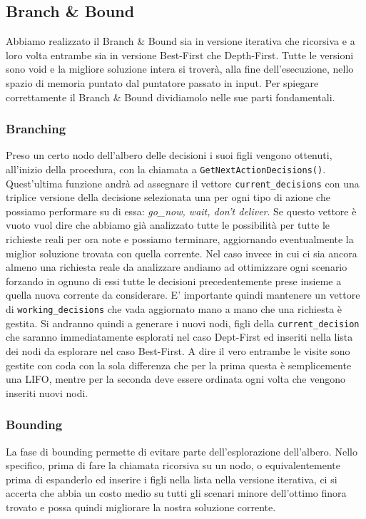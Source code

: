 \documentclass[
    article,            %
    12pt,                %
    oneside,            %
    a4paper,            %
    english,            %
    italian,                %
    sumario=tradicional,
]{abntex2}
\begin{document}
\subsection{Branch \& Bound}
Abbiamo realizzato il Branch \& Bound sia in versione iterativa che ricorsiva e a loro volta entrambe sia in versione Best-First che Depth-First. Tutte le versioni sono void e la migliore soluzione intera si troverà, alla fine dell'esecuzione, nello spazio di memoria puntato dal puntatore passato in input. Per spiegare correttamente il Branch \& Bound dividiamolo nelle sue parti fondamentali.

\subsubsection{Branching}
Preso un certo nodo dell'albero delle decisioni i suoi figli vengono ottenuti, all'inizio della procedura, con la chiamata a \texttt{GetNextActionDecisions()}. Quest'ultima funzione andrà ad assegnare il vettore \texttt{current\_decisions} con una triplice versione della decisione selezionata una per ogni tipo di azione che possiamo performare su di essa: \textit{go\_now, wait, don't deliver}. Se questo vettore è vuoto vuol dire che abbiamo già analizzato tutte le possibilità per tutte le richieste reali per ora note e possiamo terminare, aggiornando eventualmente la miglior soluzione trovata con quella corrente. 
\newline
Nel caso invece in cui ci sia ancora almeno una richiesta reale da analizzare andiamo ad ottimizzare ogni scenario forzando in ognuno di essi tutte le decisioni precedentemente prese insieme a quella nuova corrente da considerare. E' importante quindi mantenere un vettore di \texttt{working\_decisions} che vada aggiornato mano a mano che una richiesta è gestita. Si andranno quindi a generare i nuovi nodi, figli della \texttt{current\_decision} che saranno immediatamente esplorati nel caso Dept-First ed inseriti nella lista dei nodi da esplorare nel caso Best-First. A dire il vero entrambe le visite sono gestite con coda con la sola differenza che per la prima questa è semplicemente una LIFO, mentre per la seconda deve essere ordinata ogni volta che vengono inseriti nuovi nodi.

\subsubsection{Bounding}
La fase di bounding permette di evitare parte dell'esplorazione dell'albero. Nello specifico, prima di fare la chiamata ricorsiva su un nodo, o equivalentemente prima di espanderlo ed inserire i figli nella lista nella versione iterativa, ci si accerta che abbia un costo medio su tutti gli scenari minore dell'ottimo finora trovato e possa quindi migliorare la nostra soluzione corrente.
\end{document}
